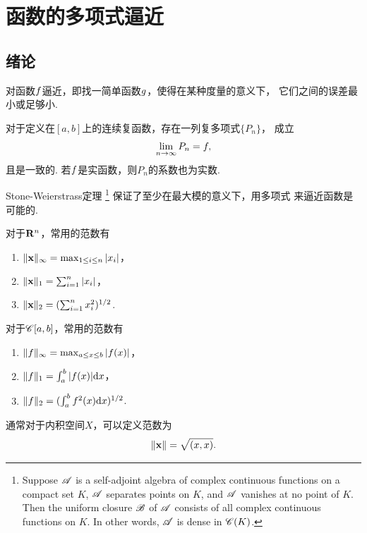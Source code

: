 \section{函数的多项式逼近}
\subsection{绪论}
  \begin{defi}[逼近]
    对函数$\mathnormal{f}$逼近，即找一简单函数$\mathnormal{g}$，使得在某种度量的意义下，
    它们之间的误差最小或足够小.
  \end{defi}

  \begin{thm}[Weierstrass]
    对于定义在$[a, b]$上的连续复函数，存在一列复多项式$\{P_n\}$，
    成立
    \[
      \lim_{n\to\infty}P_n = \mathnormal{f},
    \]
    且是一致的. 若$\mathnormal{f}$是实函数，则$P_n$的系数也为实数.
  \end{thm}
  \remark
    Stone-Weierstrass定理
    \footnote{
      Suppose $\mathscr{A}$ is a self-adjoint algebra of complex
      continuous functions on a compact set $K$, $\mathscr{A}$
      separates points on $K$, and $\mathscr{A}$ vanishes at no
      point of $K$. Then the uniform closure $\mathscr{B}$ of
      $\mathscr{A}$ consists of all complex continuous functions
      on $K$. In other words, $\mathscr{A}$ is dense in $\mathscr{C}(K)$.
    }
    保证了至少在最大模的意义下，用多项式
    来逼近函数是可能的.

  \begin{defi}[常用范数]
    对于$\mathbf{R}^n$，常用的范数有
    \begin{enumerate}
      \item $\|\textbf{x}\|_\infty = \max_{1\le i\le n}|x_i|$，
      \item $\|\textbf{x}\|_1 = \sum_{i=1}^n|x_i|$，
      \item $\|\textbf{x}\|_2 = (\sum_{i=1}^nx_i^2)^{1/2}$.
    \end{enumerate}
    对于$\mathscr{C}[a, b]$，常用的范数有
    \begin{enumerate}
      \item $\|\mathnormal{f}\|_\infty = \max_{a\le x\le b}|\mathnormal{f}(x)|$，
      \item $\|\mathnormal{f}\|_1 = \int_a^b|\mathnormal{f}(x)|\mathrm{d} x$，
      \item $\|\mathnormal{f}\|_2 = (\int_a^b\mathnormal{f}^2(x) \mathrm{d} x)^{1/2}$.
    \end{enumerate}
  \end{defi}
  \remark
    通常对于内积空间$X$，可以定义范数为
    \[
      \|\textbf{x}\| = \sqrt{(x, x)}.
    \]

